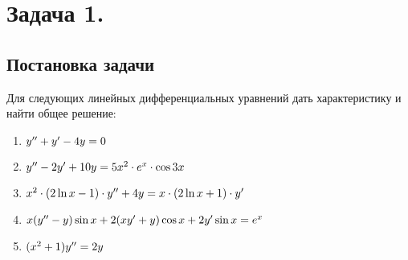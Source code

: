 

\section{Задача 1.}
\subsection{Постановка задачи}
Для следующих линейных дифференциальных уравнений 
дать характеристику и найти общее решение:


\begin{enumerate}
    \item $ y'' + y' - 4y = 0 $
    \item $ y'' - 2y' + 10y = 5x^2 \cdot e^x \cdot \cos{3x} $
    \item $ x^2 \cdot (2\ln{x} - 1) \cdot y'' + 4y = x \cdot (2\ln{x} + 1) \cdot y' $
    \item $ x(y'' - y)\sin{x} + 2(xy' + y)\cos{x} + 2y'\sin{x} = e^x $
    \item $ (x^2 + 1)y'' = 2y $
\end{enumerate}

